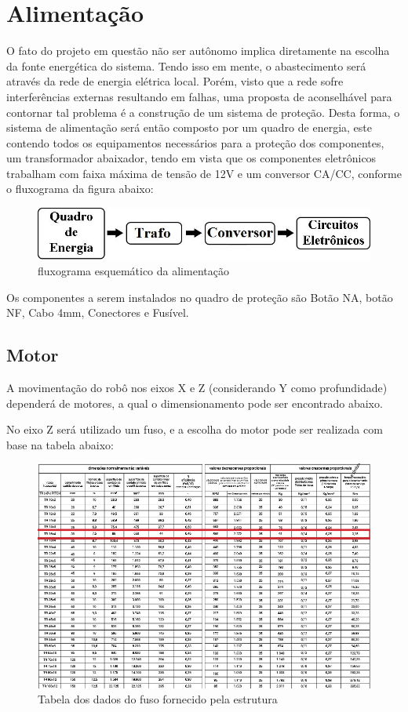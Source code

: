 \section[Alimentação]{Alimentação}

O fato do projeto em questão não ser autônomo implica diretamente na escolha da fonte energética do sistema. Tendo isso em mente, o abastecimento será através da rede de energia elétrica local.
Porém, visto que a rede sofre interferências externas resultando em falhas, uma proposta de aconselhável para contornar tal problema é a construção de um sistema de proteção.
Desta forma, o sistema de alimentação será então composto por um quadro de energia, este contendo todos os equipamentos necessários para a proteção dos componentes, um transformador abaixador, tendo em vista que os componentes eletrônicos trabalham com faixa máxima de tensão de 12V e um conversor CA/CC, conforme o fluxograma da figura abaixo: 

\begin{figure}[!h]
\centering
\includegraphics[scale=0.6, angle = 360]{figuras/fluxograma}
\caption[]{fluxograma esquemático da alimentação }
\end{figure}
\FloatBarrier

Os componentes a serem instalados no quadro de proteção são Botão NA, botão NF, Cabo 4mm, Conectores e Fusível.

\subsection{Motor}
A movimentação do robô nos eixos X e Z (considerando Y como profundidade) dependerá de motores, a qual o dimensionamento pode ser encontrado abaixo.

No eixo Z será utilizado um fuso, e a escolha do motor pode ser realizada com base na tabela abaixo:

\begin{figure}[!h]
\centering
\includegraphics[scale=0.8, angle = 360]{figuras/tabela_escolha_do_motor}
\caption[]{Tabela dos dados do fuso fornecido pela estrutura}
\end{figure}
\FloatBarrier

